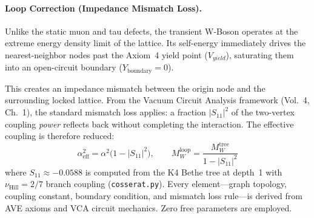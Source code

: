\paragraph{Loop Correction (Impedance Mismatch Loss).}
Unlike the static muon and tau defects, the transient W-Boson operates at the extreme energy density limit of the lattice. Its self-energy immediately drives the nearest-neighbor nodes past the Axiom~4 yield point ($V_{yield}$), saturating them into an open-circuit boundary ($Y_{\text{boundary}} = 0$).

This creates an impedance mismatch between the origin node and the surrounding locked lattice. From the Vacuum Circuit Analysis framework (Vol.~4, Ch.~1), the standard mismatch loss applies: a fraction $|S_{11}|^2$ of the two-vertex coupling \textit{power} reflects back without completing the interaction. The effective coupling is therefore reduced:
\begin{equation}
    \alpha_{\text{eff}}^2 = \alpha^2 \bigl(1 - |S_{11}|^2\bigr), \qquad
    M_W^{\text{loop}} = \frac{M_W^{\text{tree}}}{1 - |S_{11}|^2}
\end{equation}
where $S_{11} \approx -0.0588$ is computed from the K4 Bethe tree at depth~1 with $\nu_{\text{Hill}} = 2/7$ branch coupling (\texttt{cosserat.py}). Every element---graph topology, coupling constant, boundary condition, and mismatch loss rule---is derived from AVE axioms and VCA circuit mechanics. Zero free parameters are employed.

